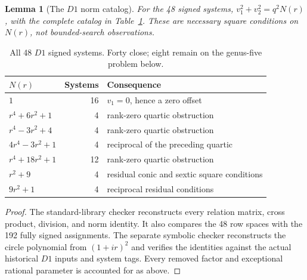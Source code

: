 \documentclass[11pt,letterpaper]{article}
\newtheorem{lemma}[theorem]{Lemma}
\theoremstyle{definition}\newtheorem{definition}[theorem]{Definition}
\theoremstyle{remark}\newtheorem{remark}[theorem]{Remark}
\begin{document}
\begin{lemma}[The $D1$ norm catalog]\label{lem:d1catalog}
For the 48 signed systems, $v_1^2+v_2^2=q^2N(r)$, with the complete catalog in Table~\ref{tab:d1norms}. These are necessary square conditions on $N(r)$, not bounded-search observations.
\end{lemma}
\begin{table}[htbp]
\centering\small
\begin{tabular}{lrl}
\toprule
$N(r)$ & Systems & Consequence\\
\midrule
$1$ &16& $v_1=0$, hence a zero offset\\
$r^4+6r^2+1$ &4& rank-zero quartic obstruction\\
$r^4-3r^2+4$ &4& rank-zero quartic obstruction\\
$4r^4-3r^2+1$ &4& reciprocal of the preceding quartic\\
$r^4+18r^2+1$ &12& rank-zero quartic obstruction\\
$r^2+9$ &4& residual conic and sextic square conditions\\
$9r^2+1$ &4& reciprocal residual conditions\\
\bottomrule
\end{tabular}
\caption{All 48 $D1$ signed systems. Forty close; eight remain on the genus-five problem below.}\label{tab:d1norms}
\end{table}
\begin{proof}
The standard-library checker reconstructs every relation matrix, cross product, division, and norm identity. It also compares the 48 row spaces with the 192 fully signed assignments. The separate symbolic checker reconstructs the circle polynomial from $(1+ir)^2$ and verifies the identities against the actual historical $D1$ inputs and system tags. Every removed factor and exceptional rational parameter is accounted for as above.
\end{proof}
\end{document}
